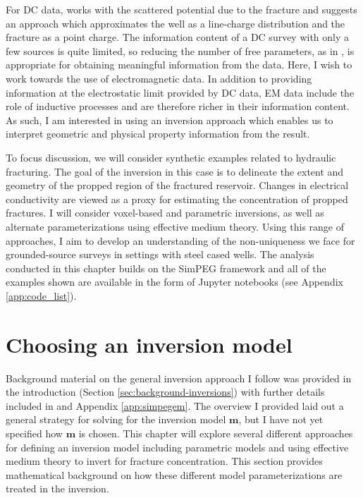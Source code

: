 For DC data, \cite{Weiss2015} works with the scattered potential due to the fracture and suggests an approach which approximates the well as a line-charge distribution and the fracture as a point charge. The information content of a DC survey with only a few sources is quite limited, so reducing the number of free parameters, as in \cite{Weiss2015}, is appropriate for obtaining meaningful information from the data. Here, I wish to work towards the use of electromagnetic data. In addition to providing information at the electrostatic limit provided by DC data, EM data include the role of inductive processes and are therefore richer in their information content. As such, I am interested in using an inversion approach which enables us to interpret geometric and physical property information from the result.

To focus discussion, we will consider synthetic examples related to hydraulic fracturing. The goal of the inversion in this case is to delineate the extent and geometry of the propped region of the fractured reservoir. Changes in electrical conductivity are viewed as a proxy for estimating the concentration of propped fractures. I will consider voxel-based and parametric inversions, as well as alternate parameterizations using effective medium theory. Using this range of approaches, I aim to develop an understanding of the non-uniqueness we face for grounded-source surveys in settings with steel cased wells. The analysis conducted in this chapter builds on the SimPEG framework and all of the examples shown are available in the form of Jupyter notebooks (see Appendix \ref{app:code_list}).


\section{Choosing an inversion model}

Background material on the general inversion approach I follow was provided in the introduction (Section \ref{sec:background-inversions}) with further details included in \cite{Cockett2015} and Appendix \ref{app:simpegem}. The overview I provided
laid out a general strategy for solving for the inversion model $\mathbf{m}$, but I have not yet specified how $\mathbf{m}$ is chosen. This chapter will explore several different approaches for defining an inversion model including parametric models and using effective medium theory to invert for fracture concentration. This section provides mathematical background on how these different model parameterizations are treated in the inversion.

